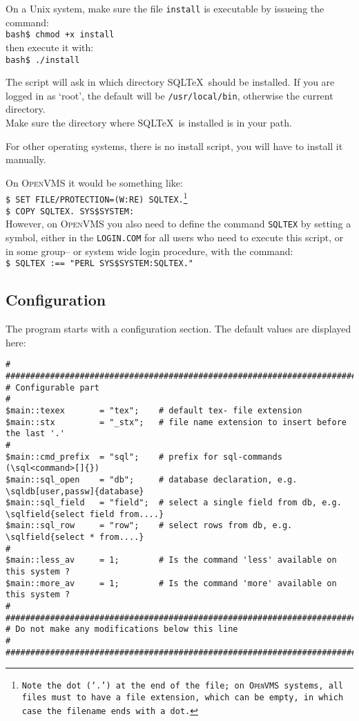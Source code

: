 \documentclass{article}
\newcommand{\vs}{\vspace{3mm}}
\begin{document}
\vs

On a Unix system, make sure the file \texttt{install} is executable by issueing
the command:\\
\texttt{bash\$ chmod +x install}\\
then execute it with:\\
\texttt{bash\$ ./install}

The script will ask in which directory SQL\TeX\ should be installed. If you are
logged in as `root', the default will be \texttt{/usr/local/bin}, otherwise the
current directory.\\
Make sure the directory where SQL\TeX\ is installed is in your path.

\vs

For other operating systems, there is no install script, you will have to install
it manually.

On \textsc{OpenVMS} it would be something like:\\
\texttt{\$ SET FILE/PROTECTION=(W:RE) SQLTEX.\footnote{Note the dot (`.') at the end of the file; on
\textsc{OpenVMS} systems, all files must to have a file extension, which can
be empty, in which case the filename ends with a dot.}\\
\$ COPY SQLTEX. SYS\$SYSTEM:}\\
However, on \textsc{OpenVMS} you also need to define the command \texttt{SQLTEX} by setting a symbol,
either in the \texttt{LOGIN.COM} for all users who need to execute this script, or in some group-- or
system wide login procedure, with the command:\\
\texttt{\$ SQLTEX :== "PERL SYS\$SYSTEM:SQLTEX."}\\

\subsection{Configuration}\label{config}

The program starts with a configuration section. The default values are displayed
here:

\vs

{\footnotesize\begin{verbatim}
#
################################################################################
# Configurable part
#
$main::texex       = "tex";    # default tex- file extension
$main::stx         = "_stx";   # file name extension to insert before the last '.'
#
$main::cmd_prefix  = "sql";    # prefix for sql-commands (\sql<command>[]{})
$main::sql_open    = "db";     # database declaration, e.g. \sqldb[user,passw]{database}
$main::sql_field   = "field";  # select a single field from db, e.g. \sqlfield{select field from....}
$main::sql_row     = "row";    # select rows from db, e.g. \sqlfield{select * from....}
#
$main::less_av     = 1;        # Is the command 'less' available on this system ?
$main::more_av     = 1;        # Is the command 'more' available on this system ?
#
################################################################################
# Do not make any modifications below this line                                #
################################################################################
\end{verbatim}}
\end{document}

